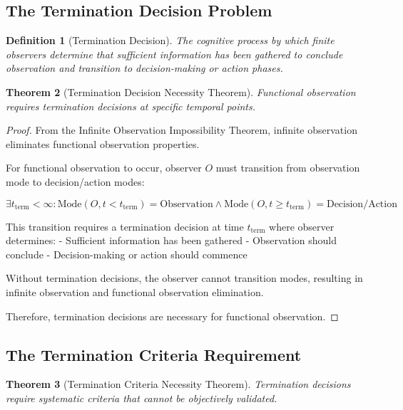 \documentclass[12pt,a4paper]{article}
\newtheorem{theorem}{Theorem}[section]
\newtheorem{definition}[theorem]{Definition}
\begin{document}
\subsection{The Termination Decision Problem}

\begin{definition}[Termination Decision]
The cognitive process by which finite observers determine that sufficient information has been gathered to conclude observation and transition to decision-making or action phases.
\end{definition}

\begin{theorem}[Termination Decision Necessity Theorem]
Functional observation requires termination decisions at specific temporal points.
\end{theorem}

\begin{proof}
From the Infinite Observation Impossibility Theorem, infinite observation eliminates functional observation properties.

For functional observation to occur, observer $O$ must transition from observation mode to decision/action modes:

$$\exists t_{\text{term}} < \infty : \text{Mode}(O, t < t_{\text{term}}) = \text{Observation} \land \text{Mode}(O, t \geq t_{\text{term}}) = \text{Decision/Action}$$

This transition requires a termination decision at time $t_{\text{term}}$ where observer determines:
- Sufficient information has been gathered
- Observation should conclude
- Decision-making or action should commence

Without termination decisions, the observer cannot transition modes, resulting in infinite observation and functional observation elimination.

Therefore, termination decisions are necessary for functional observation.
\end{proof}

\subsection{The Termination Criteria Requirement}

\begin{theorem}[Termination Criteria Necessity Theorem]
Termination decisions require systematic criteria that cannot be objectively validated.
\end{theorem}
\end{document}
